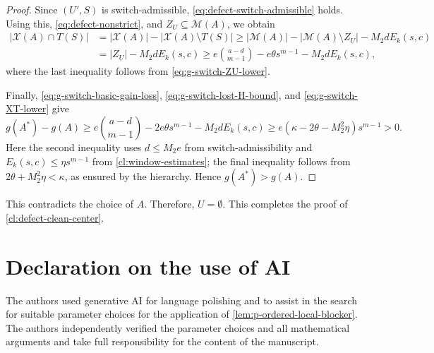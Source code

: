\documentclass[10pt,a4paper]{article}
\numberwithin{equation}{section}
\theoremstyle{definition}
\newcommand{\X}{\mathcal X}
\newcommand{\M}{\mathcal M}
\begin{document}
\begin{proof}
        Since $(U',S)$ is switch-admissible, \eqref{eq:defect-switch-admissible}
        holds. Using this, \eqref{eq:defect-nonstrict}, and
        $Z_U\subseteq\M(A)$, we obtain
        \begin{equation}\label{eq:g-switch-XT-lower}
                \begin{aligned}
                        |\X(A)\cap T(S)|
                         & =
                        |\X(A)|-|\X(A)\setminus T(S)|\ge
                        |\M(A)|-|\M(A)\setminus Z_U|-M_2dE_k(s,c) \\
                         & =
                        |Z_U|-M_2dE_k(s,c) \ge
                        e\binom{a-d}{m-1}-e\theta s^{m-1}
                        -M_2dE_k(s,c),
                \end{aligned}
        \end{equation}
        where the last inequality follows from \eqref{eq:g-switch-ZU-lower}.

        Finally, \eqref{eq:g-switch-basic-gain-loss},
        \eqref{eq:g-switch-lost-H-bound}, and
        \eqref{eq:g-switch-XT-lower} give
        \[
                g(A^*)-g(A)\ge e\binom{a-d}{m-1}
                -2e\theta s^{m-1}-M_2dE_k(s,c)\ge e(\kappa-2\theta-M_2^2\eta)s^{m-1}>0.
        \]
        Here the second inequality uses $d\le M_2e$ from
        switch-admissibility and $E_k(s,c)\le\eta s^{m-1}$ from
        \cref{cl:window-estimates}; the final inequality follows from
        $2\theta+M_2^2\eta<\kappa$, as ensured by the hierarchy.
        Hence $g(A^*)>g(A)$.
\end{proof}
This contradicts the choice of $A$.
Therefore, $U=\emptyset$.
This completes the proof of \cref{cl:defect-clean-center}.


\section*{Declaration on the use of AI}
The authors used generative AI for language polishing and to assist in the search for suitable parameter choices for the application of \cref{lem:p-ordered-local-blocker}.
The authors independently verified the parameter choices and all mathematical arguments and take full responsibility for the content of the manuscript.
\end{document}
